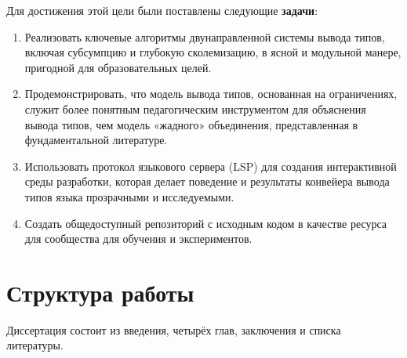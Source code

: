 Для достижения этой цели были поставлены следующие \textbf{задачи}:
\begin{enumerate}
    \item Реализовать ключевые алгоритмы двунаправленной системы вывода типов, включая субсумпцию и глубокую сколемизацию, в ясной и модульной манере, пригодной для образовательных целей.
    \item Продемонстрировать, что модель вывода типов, основанная на ограничениях, служит более понятным педагогическим инструментом для объяснения вывода типов, чем модель «жадного» объединения, представленная в фундаментальной литературе.
    \item Использовать протокол языкового сервера (LSP) для создания интерактивной среды разработки, которая делает поведение и результаты конвейера вывода типов языка прозрачными и исследуемыми.
    \item Создать общедоступный репозиторий с исходным кодом \cite{deemp-arbitrary-rank-tutorial} в качестве ресурса для сообщества для обучения и экспериментов.
\end{enumerate}

\section*{Структура работы}

Диссертация состоит из введения, четырёх глав, заключения и списка литературы.


